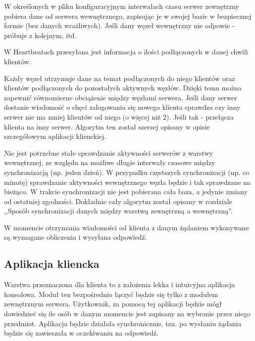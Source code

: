{\par{W określonych w pliku konfiguracyjnym interwałach czasu serwer zewnętrzny pobiera dane od serwera wewnętrznego, zapisując je w swojej bazie w bezpiecznej formie (bez danych wrażliwych). Jeśli dany węzeł wewnętrzny nie odpowie - próbuje z kolejnym, itd.}

\par{W Heartbeatach przesyłana jest informacja o ilości podłączonych w danej chwili klientów.}

\par{Każdy węzeł utrzymuje dane na temat podłączonych do niego klientów oraz klientów podłączonych do pozostałych aktywnych węzłów. Dzięki temu można zapewnić równomierne obciążenie między węzłami serwera. Jeśli dany serwer dostanie wiadomość o chęci zalogowania się nowego klienta sprawdza czy inny serwer nie ma mniej klientów od niego (o więcej niż 2). Jeśli tak - przełącza klienta na inny serwer. Algorytm ten został szerzej opisany w opisie szczegółowym aplikacji klienckiej.}

\par{Nie jest potrzebne stałe sprawdzanie aktywności serwerów z warstwy wewnętrznej, ze względu na możliwe długie interwały czasowe między synchronizacją (np. jeden dzień). W przypadku częstszych synchronizacji (np. co minutę) sprawdzanie aktywności wewnętrznego węzła będzie i tak sprawdzane na bieżąco. W trakcie synchronizacji nie jest pobierana cała baza, a jedynie zmiany od ostatniej zgodności. Dokładnie cały algorytm został opisany w rozdziale ,,Sposób synchronizacji danych między warstwą zewnętrzną a wewnętrzną''.}

\par{W momencie otrzymania wiadomości od klienta z danym żądaniem wykonywane są wymagane obliczenia i wysyłana odpowiedź.}


\subsection[Aplikacja kliencka]{Aplikacja kliencka}

\par{Warstwa przeznaczona dla klienta to z założenia lekka i intuicyjna aplikacja konsolowa. Moduł ten bezpośrednio łączyć będzie się tylko z modułem zewnętrznym serwera. Użytkownik, za pomocą tej aplikacji będzie mógł dowiedzieć się ile osób w danym momencie jest zapisany na wybranie przez niego przedmiot. Aplikacja będzie działała synchronicznie, tzn. po wysłaniu żądania będzie się zawieszała w oczekiwaniu na odpowiedź.}

}
